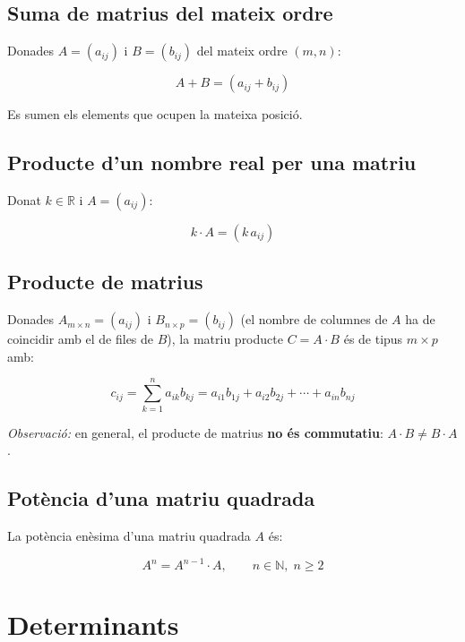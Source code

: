 \subsection{Suma de matrius del mateix ordre}

Donades $A = (a_{ij})$ i $B = (b_{ij})$ del mateix ordre $(m, n)$:

\begin{equation*}
A + B = (a_{ij} + b_{ij})
\end{equation*}

Es sumen els elements que ocupen la mateixa posició.

\subsection{Producte d'un nombre real per una matriu}

Donat $k \in \mathbb{R}$ i $A = (a_{ij})$:

\begin{equation*}
k\cdot A = (k\,a_{ij})
\end{equation*}

\subsection{Producte de matrius}

Donades $A_{m\times n} = (a_{ij})$ i $B_{n\times p} = (b_{ij})$ (el nombre de columnes de $A$ ha de coincidir amb el de files de $B$), la matriu producte $C = A\cdot B$ és de tipus $m\times p$ amb:

\begin{equation*}
c_{ij} = \sum_{k=1}^{n} a_{ik}b_{kj} = a_{i1}b_{1j} + a_{i2}b_{2j} + \cdots + a_{in}b_{nj}
\end{equation*}

\emph{Observació:} en general, el producte de matrius \textbf{no és commutatiu}: $A\cdot B \neq B\cdot A$.

\subsection{Potència d'una matriu quadrada}

La potència enèsima d'una matriu quadrada $A$ és:

\begin{equation*}
A^n = A^{n-1}\cdot A, \qquad n \in \mathbb{N},\; n \ge 2
\end{equation*}

\section{Determinants}


